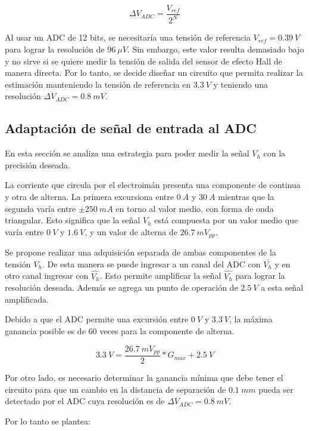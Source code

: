  \begin{equation*}
 	\Delta V_{ADC}=\frac{V_{ref}}{2^N}
 \end{equation*}

Al usar un ADC de 12 bits, se necesitaría una tensión de referencia $V_{ref} = 0.39\:V$ para lograr la resolución de $96\:\mu V$. Sin embargo, este valor resulta demasiado bajo y no sirve si se quiere medir la tensión de salida del sensor de efecto Hall de manera directa. Por lo tanto, se decide diseñar un circuito que permita realizar la estimación manteniendo la tensión de referencia en $3.3\:V$ y teniendo una resolución $\Delta V_{ADC}=0.8\:mV$.

\subsection{Adaptación de señal de entrada al ADC}\label{sec_adaptacion_señal_vh_ADC}

En esta sección se analiza una estrategia para poder medir la señal $V_h$ con la precisión deseada.

La corriente que circula por el electroimán presenta una componente de continua y otra de alterna. La primera excursiona entre $0\:A$ y $30\:A$ mientras que la segunda varía entre $\pm 250\:mA$ en torno al valor medio, con forma de onda triangular. Esto significa que la señal $V_h$ está compuesta por un valor medio que varía entre $0\:V$ y $1.6\:V$, y un valor de alterna de $26.7\:mV_{pp}$.

Se propone realizar una adquisición separada de ambas componentes de la tensión $V_h$. De esta manera se puede ingresar a un canal del ADC con $\bar{V_h}$ y en otro canal ingresar con $\hat{V_h}$. Esto permite amplificar la señal $\hat{V_h}$ para lograr la resolución deseada. Además se agrega un punto de operación de $2.5\:V$ a esta señal amplificada.

Debido a que el ADC permite una excursión entre $0\:V$ y $3.3\:V$, la máxima ganancia posible es de 60 veces para la componente de alterna.

\begin{equation*}
	3.3 \:V = \frac{26.7\:mV_{pp}}{2}*G_{max}+2.5\:V
\end{equation*}

Por otro lado, es necesario determinar la ganancia mínima que debe tener el circuito para que un cambio en la distancia de separación de $0.1\:mm$ pueda ser detectado por el ADC cuya resolución es de $\Delta V_{ADC}=0.8\:mV$.

Por lo tanto se plantea:

